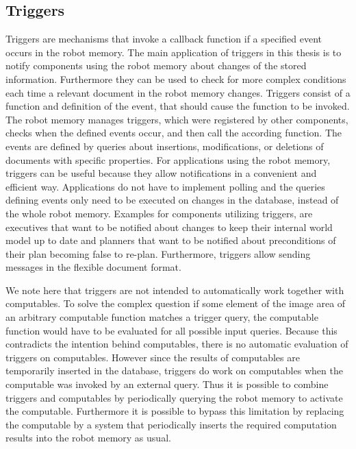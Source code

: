 \subsection{Triggers}
\label{sec:trigger}
Triggers are mechanisms that invoke a callback function if a specified
event occurs in the robot memory. The main application of triggers in
this thesis is to notify components using the robot memory about
changes of the stored information. Furthermore they can be used to
check for more complex conditions each time a relevant document in the
robot memory changes. Triggers consist of a function and definition of
the event, that should cause the function to be invoked. The robot
memory manages triggers, which were registered by other
components, checks when the defined events occur, and then call the according
function. The events are defined by queries about
insertions, modifications, or deletions of documents with specific
properties. For applications using the robot memory, triggers can be
useful because they allow notifications in a convenient and efficient
way. Applications do not have to implement polling and the queries
defining events only need to be executed on changes in the database,
instead of the whole robot memory. Examples for components utilizing
triggers, are executives that want to be notified about changes to
keep their internal world model up to date and planners that want to
be notified about preconditions of their plan becoming false to
re-plan. Furthermore, triggers allow sending messages in the flexible
document format.

We note here that triggers are not intended to automatically work
together with computables. To solve the complex question if
some element of the image area of an arbitrary computable function
matches a trigger query, the computable function would have to be
evaluated for all possible input queries. Because this contradicts the
intention behind computables, there is no automatic evaluation of
triggers on computables. However since the results of computables
are temporarily inserted in the database, triggers do work on computables
when the computable was invoked by an external query. Thus it is
possible to combine triggers and computables by periodically querying
the robot memory to activate the computable. Furthermore it is
possible to bypass this limitation by replacing the computable by a
system that periodically inserts the required computation results into
the robot memory as usual.

